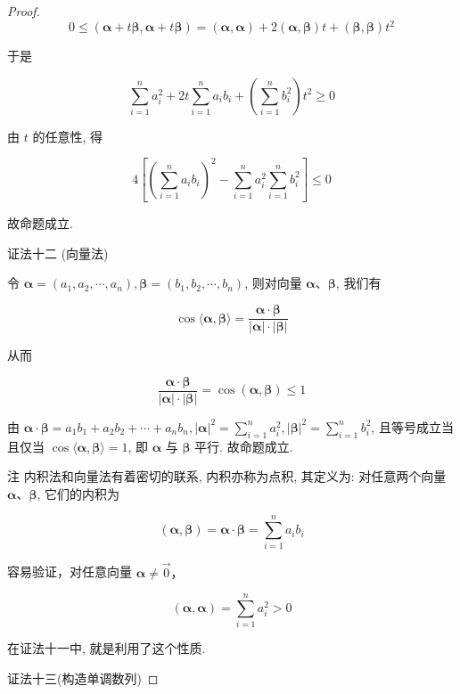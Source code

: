 \begin{proof}
	$$
	0 \leqslant(\boldsymbol{\alpha}+t \boldsymbol{\beta}, \boldsymbol{\alpha}+t \boldsymbol{\beta})=(\boldsymbol{\alpha}, \boldsymbol{\alpha})+2(\boldsymbol{\alpha}, \boldsymbol{\beta}) t+(\boldsymbol{\beta}, \boldsymbol{\beta}) t^{2}
	$$
	
	于是
	
	$$
	\sum_{i=1}^{n} a_{i}^{2}+2 t \sum_{i=1}^{n} a_{i} b_{i}+\left(\sum_{i=1}^{n} b_{i}^{2}\right) t^{2} \geqslant 0
	$$
	
	由 $t$ 的任意性, 得
	
	$$
	4\left[\left(\sum_{i=1}^{n} a_{i} b_{i}\right)^{2}-\sum_{i=1}^{n} a_{i}^{2} \sum_{i=1}^{n} b_{i}^{2}\right] \leqslant 0
	$$
	
	故命题成立.
	
	证法十二 (向量法)
	
	令 $\boldsymbol{\alpha}=\left(a_{1}, a_{2}, \cdots, a_{n}\right), \boldsymbol{\beta}=\left(b_{1}, b_{2}, \cdots, b_{n}\right)$, 则对向量 $\boldsymbol{\alpha} 、 \boldsymbol{\beta}$, 我们有
	
	$$
	\cos \langle\boldsymbol{\alpha}, \boldsymbol{\beta}\rangle=\frac{\boldsymbol{\alpha} \cdot \boldsymbol{\beta}}{|\boldsymbol{\alpha}| \cdot|\boldsymbol{\beta}|}
	$$
	
	从而
	
	$$
	\frac{\boldsymbol{\alpha} \cdot \boldsymbol{\beta}}{|\boldsymbol{\alpha}| \cdot|\boldsymbol{\beta}|}=\cos (\boldsymbol{\alpha}, \boldsymbol{\beta}) \leqslant 1
	$$
	
	由 $\boldsymbol{\alpha} \cdot \boldsymbol{\beta}=a_{1} b_{1}+a_{2} b_{2}+\cdots+a_{n} b_{n},|\boldsymbol{\alpha}|^{2}=\sum_{i=1}^{n} a_{i}^{2},|\boldsymbol{\beta}|^{2}=\sum_{i=1}^{n} b_{i}^{2}$, 且等号成立当且仅当 $\cos \langle\boldsymbol{\alpha}, \boldsymbol{\beta}\rangle=1$, 即 $\boldsymbol{\alpha}$ 与 $\boldsymbol{\beta}$ 平行. 故命题成立.
	
	注 内积法和向量法有着密切的联系, 内积亦称为点积, 其定义为: 对任意两个向量 $\boldsymbol{\alpha} 、 \boldsymbol{\beta}$, 它们的内积为
	
	$$
	(\boldsymbol{\alpha}, \boldsymbol{\beta})=\boldsymbol{\alpha} \cdot \boldsymbol{\beta}=\sum_{i=1}^{n} a_{i} b_{i}
	$$
	
	容易验证，对任意向量 $\boldsymbol{\alpha} \neq \overrightarrow{0} ，$
	
	$$
	(\boldsymbol{\alpha}, \boldsymbol{\alpha})=\sum_{i=1}^{n} a_{i}^{2}>0
	$$
	
	在证法十一中, 就是利用了这个性质.
	
	证法十三(构造单调数列)
	

\end{proof}
